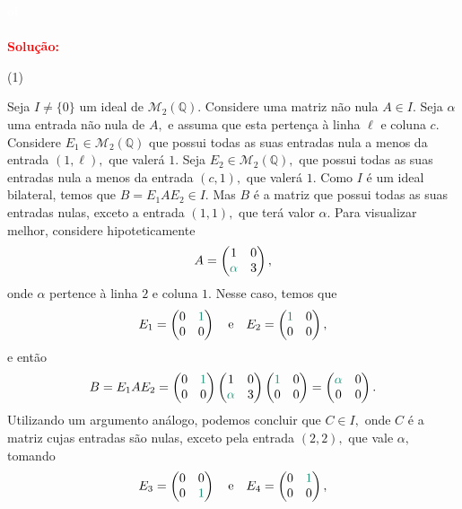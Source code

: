 \documentclass[11pt,a4paper]{article}
\newcommand{\dividiritens}[1]{\begin{tasks}[counter-format={(tsk[a])},label-width=3.6ex, label-format = {\bfseries}, column-sep = {0pt}](1) #1 \end{tasks}}
\newcommand{\pers}[1]{\textcolor{Floresta}{$\negrito{(#1)} $}}
\newcommand{\solucao}[1]{
\textbf{\textcolor{white}{oi}\\ \\ \textcolor{red}{Solução:}} #1}
\begin{document}
\solucao{
\dividiritens{
\task[\pers{a}] }Seja $I \neq \{ 0 \}$ um ideal de $\mathcal{M}_2(\mathbb{Q}).$ Considere uma matriz não nula $A \in I. $ Seja $\alpha$ uma entrada não nula de $A,$ e assuma que esta pertença à linha $\ell$ e coluna $c.$ Considere $E_1 \in \mathcal{M}_2(\mathbb{Q})$ que possui todas as suas entradas nula a menos da entrada $(1, \ell),$ que valerá $1.$ Seja $E_2 \in \mathcal{M}_2(\mathbb{Q}),$ que possui todas as suas entradas nula a menos da entrada $(c, 1),$ que valerá $1.$ Como $I$ é um ideal bilateral, temos que $B = E_1AE_2 \in I.$ Mas $B$ é a matriz que possui todas as suas entradas nulas, exceto a entrada $(1,1),$ que terá valor $\alpha.$ Para visualizar melhor, considere hipoteticamente
\[
A = \begin{pmatrix} 1 & 0 \\ \textcolor{PineGreen}{\alpha} & 3 \end{pmatrix},
\]
onde $\alpha$ pertence à linha $2$ e coluna $1.$ Nesse caso, temos que
\[
E_1 = \begin{pmatrix} 0 & \textcolor{PineGreen}{1} \\ 0 & 0 \end{pmatrix} \quad \mbox{e} \quad E_2 = \begin{pmatrix}  \textcolor{PineGreen}{1} & 0 \\ 0 & 0 \end{pmatrix},
\]
e então
\[
B = E_1AE_2 = \begin{pmatrix} 0 & \textcolor{PineGreen}{1} \\ 0 & 0 \end{pmatrix} \begin{pmatrix} 1 & 0 \\ \textcolor{PineGreen}{\alpha} & 3 \end{pmatrix} \begin{pmatrix}  \textcolor{PineGreen}{1} & 0 \\ 0 & 0 \end{pmatrix} = \begin{pmatrix} \textcolor{PineGreen}{\alpha} & 0 \\ 0 & 0 \end{pmatrix}.
\]
Utilizando um argumento análogo, podemos concluir que $C \in I,$ onde $C$ é a matriz cujas entradas são nulas, exceto pela entrada $(2,2),$ que vale $\alpha,$ tomando 
\[
E_3 = \begin{pmatrix} 0 & 0 \\ 0 & \textcolor{PineGreen}{1} \end{pmatrix} \quad \mbox{e} \quad E_4 = \begin{pmatrix}  0 & \textcolor{PineGreen}{1} \\ 0 & 0 \end{pmatrix},
\]}
\end{document}
